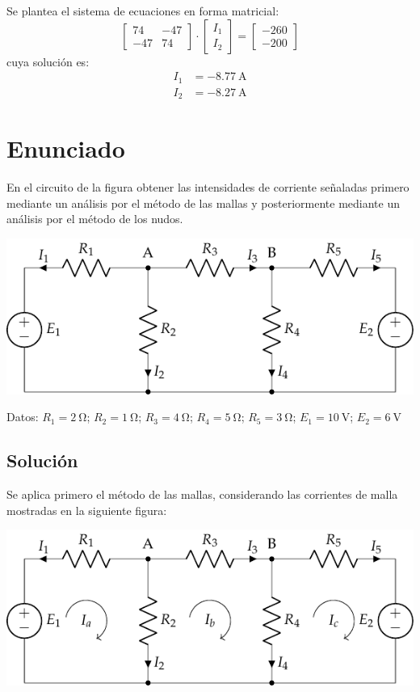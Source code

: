 Se plantea el sistema de ecuaciones en forma matricial:
\begin{equation*}
  \begin{bmatrix}
    74 & -47  \\
    -47 & 74
  \end{bmatrix} \cdot
  \begin{bmatrix}
    I_1\\
    I_2
  \end{bmatrix} =
  \begin{bmatrix}
    -260 \\
    -200
  \end{bmatrix}
\end{equation*}
cuya solución es:
\begin{align*}
  I_1&=\qty{-8.77}{\ampere}\\
  I_2&=\qty{-8.27}{\ampere}
\end{align*}

\section{Enunciado}
En el circuito de la figura obtener las intensidades de corriente
señaladas primero mediante un análisis por el método de las mallas y
posteriormente mediante un análisis por el método de los nudos.

\begin{center}
  \includegraphics{figuras/BT1_08.pdf}
\end{center}

  Datos: $R_1 = \qty{2}{\ohm}$; $R_2 = \qty{1}{\ohm}$; $R_3 = \qty{4}{\ohm}$; $R_4 = \qty{5}{\ohm}$; $R_5 = \qty{3}{\ohm}$; $E_1 = \qty{10}{\volt}$; $E_2 = \qty{6}{\volt}$

\subsection*{Solución}
Se aplica primero el método de las mallas, considerando las corrientes
de malla mostradas en la siguiente figura:
\begin{center}
  \includegraphics{figuras/BT1_08_mallas.pdf}
\end{center}


